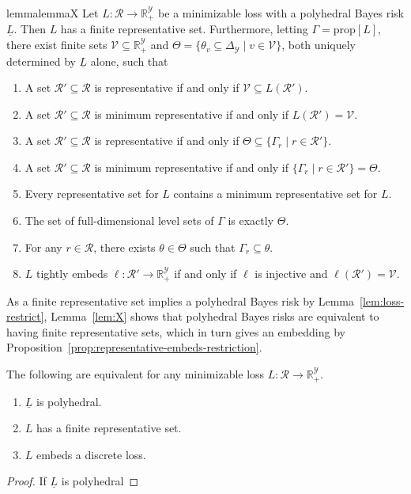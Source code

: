 \documentclass[twoside,11pt]{article}
\newcommand{\reals}{\mathbb{R}}
\newcommand{\prop}[1]{\mathrm{prop}[#1]}
\newcommand{\simplex}{\Delta_\Y}
\newcommand{\R}{\mathcal{R}}
\newcommand{\V}{\mathcal{V}}
\newcommand{\Y}{\mathcal{Y}}
\newcommand{\risk}[1]{\underline{#1}}
\begin{document}
\begin{restatable}{lemma}{lemmaX}\label{lem:X}
  Let $L: \R \to \reals^\Y_+$ be a minimizable loss with a polyhedral Bayes risk $\risk L$.
  Then $L$ has a finite representative set.
  Furthermore, letting $\Gamma = \prop{L}$, there exist finite sets
  $\V \subseteq \reals^\Y_+$ and
  $\Theta = \{\theta_v \subseteq \simplex \mid v\in\V\}$,
  both uniquely determined by $\risk{L}$ alone,
  such that
  \begin{enumerate}
  \item A set $\R'\subseteq\R$ is representative if and only if $\V \subseteq L(\R')$.\label{item:X-rep-V}
  \item A set $\R'\subseteq\R$ is minimum representative if and only if $L(\R') = \V$.\label{item:X-min-V}
  \item A set $\R'\subseteq\R$ is representative if and only if $\Theta \subseteq \{\Gamma_r \mid r \in \R'\}$.\label{item:X-rep-Theta}
  \item A set $\R'\subseteq\R$ is minimum representative if and only if $\{\Gamma_r \mid r \in \R'\} = \Theta$.\label{item:X-min-Theta}
  \item Every representative set for $L$ contains a minimum representative set for $L$.\label{item:X-rep-contain-min}
  \item The set of full-dimensional level sets of $\Gamma$ is exactly $\Theta$.\label{item:X-full-dim}
  \item For any $r \in \R$, there exists $\theta \in \Theta$ such that $\Gamma_r \subseteq \theta$.\label{item:X-redundant}
  \item $L$ tightly embeds $\ell:\R'\to\reals^\Y_+$ if and only if $\ell$ is injective and $\ell(\R') = \V$.\label{item:X-tight-embed}
  \end{enumerate}
\end{restatable}

As a finite representative set implies a polyhedral Bayes risk by Lemma~\ref{lem:loss-restrict}, Lemma~\ref{lem:X} shows that polyhedral Bayes risks are equivalent to having finite representative sets, which in turn gives an embedding by
Proposition~\ref{prop:representative-embeds-restriction}.
\begin{corollary}\label{cor:poly-risk-fin-rep}
  The following are equivalent for any minimizable loss $L:\R\to\reals^\Y_+$.
  \begin{enumerate}
  \item $\risk{L}$ is polyhedral.
  \item $L$ has a finite representative set.
  \item $L$ embeds a discrete loss.
  \end{enumerate}
\end{corollary}
\begin{proof}
	If $\risk L$ is polyhedral
\end{proof}
\end{document}
